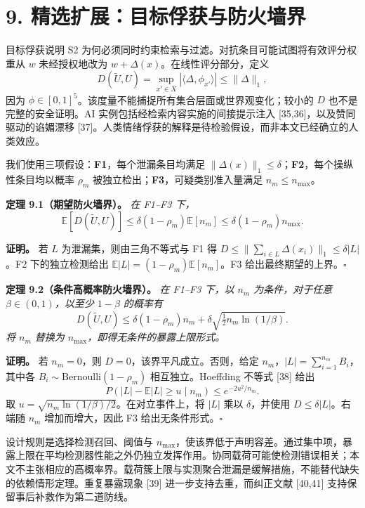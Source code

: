 \documentclass[
  chinese,
  11pt]{article}
\begin{document}
\section{9. 精选扩展：目标俘获与防火墙界}\label{ux7cbeux9009ux6269ux5c55ux76eeux6807ux4fd8ux83b7ux4e0eux9632ux706bux5899ux754c}

目标俘获说明 S2 为何必须同时约束检索与过滤。对抗条目可能试图将有效评分权重从 \(w\) 未经授权地改为 \(w+\Delta(x)\)。在线性评分部分，定义 \[
D(\widetilde U,U)=\sup_{x'\in X}|\langle\Delta,\phi_{x'}\rangle|
\leq\|\Delta\|_1,
\tag{20}
\] 因为 \(\phi\in[0,1]^5\)。该度量不能捕捉所有集合层面或世界观变化；较小的 \(D\) 也不是完整的安全证明。AI 实例包括经检索内容实施的间接提示注入 {[}35,36{]}，以及赞同驱动的谄媚漂移 {[}37{]}。人类情绪俘获的解释是待检验假设，而非本文已经确立的人类效应。

我们使用三项假设：\textbf{F1}，每个泄漏条目均满足 \(\|\Delta(x)\|_1\leq\delta\)；\textbf{F2}，每个操纵性条目均以概率 \(\rho_m\) 被独立检出；\textbf{F3}，可疑类别准入量满足 \(n_m\leq n_{\max}\)。

\textbf{定理 9.1（期望防火墙界）。} \emph{在 F1--F3 下，} \[
\mathbb E[D(\widetilde U,U)]
\leq\delta(1-\rho_m)\mathbb E[n_m]
\leq\delta(1-\rho_m)n_{\max}.
\tag{21}
\]

\textbf{证明。} 若 \(L\) 为泄漏集，则由三角不等式与 F1 得 \(D\leq\|\sum_{i\in L}\Delta(x_i)\|_1\leq\delta|L|\)。F2 下的独立检测给出 \(\mathbb E|L|=(1-\rho_m)\mathbb E[n_m]\)。F3 给出最终期望的上界。\(\square\)

\textbf{定理 9.2（条件高概率防火墙界）。} \emph{在 F1--F3 下，以 \(n_m\) 为条件，对于任意 \(\beta\in(0,1)\)，以至少 \(1-\beta\) 的概率有} \[
D(\widetilde U,U)\leq
\delta(1-\rho_m)n_m+
\delta\sqrt{\tfrac12n_m\ln(1/\beta)}.
\tag{22}
\] \emph{将 \(n_m\) 替换为 \(n_{\max}\)，即得无条件的暴露上限形式。}

\textbf{证明。} 若 \(n_m=0\)，则 \(D=0\)，该界平凡成立。否则，给定 \(n_m\)，\(|L|=\sum_{i=1}^{n_m}B_i\)，其中各 \(B_i\sim\mathrm{Bernoulli}(1-\rho_m)\) 相互独立。Hoeffding 不等式 {[}38{]} 给出 \[
P(|L|-\mathbb E|L|\geq u\mid n_m)\leq e^{-2u^2/n_m}.
\] 取 \(u=\sqrt{n_m\ln(1/\beta)/2}\)。在对立事件上，将 \(|L|\) 乘以 \(\delta\)，并使用 \(D\leq\delta|L|\)。右端随 \(n_m\) 增加而增大，因此 F3 给出无条件形式。\(\square\)

设计规则是选择检测召回、阈值与 \(n_{\max}\)，使该界低于声明容差。通过集中项，暴露上限在平均检测器性能之外仍独立发挥作用。协同载荷可能使检测错误相关；本文不主张相应的高概率界。载荷簇上限与实测聚合泄漏是缓解措施，不能替代缺失的依赖情形定理。重复暴露现象 {[}39{]} 进一步支持去重，而纠正文献 {[}40,41{]} 支持保留事后补救作为第二道防线。
\end{document}

